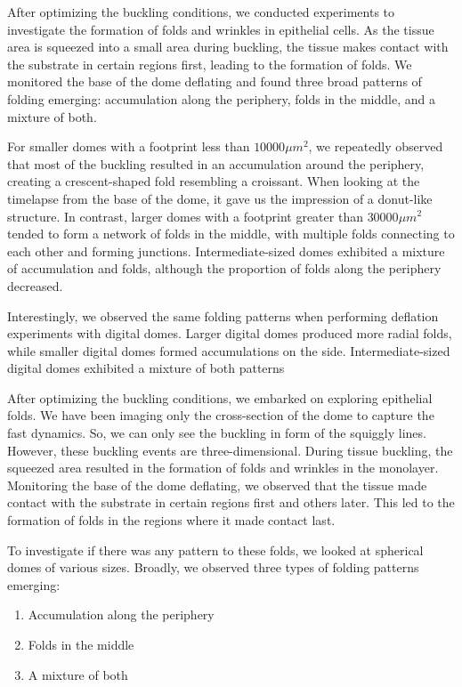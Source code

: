 After optimizing the buckling conditions, we conducted experiments to
investigate the formation of folds and wrinkles in epithelial cells. As
the tissue area is squeezed into a small area during buckling, the
tissue makes contact with the substrate in certain regions first,
leading to the formation of folds. We monitored the base of the dome
deflating and found three broad patterns of folding emerging:
accumulation along the periphery, folds in the middle, and a mixture of
both.

For smaller domes with a footprint less than \(10000 \mu m^2\), we
repeatedly observed that most of the buckling resulted in an
accumulation around the periphery, creating a crescent-shaped fold
resembling a croissant. When looking at the timelapse from the base of
the dome, it gave us the impression of a donut-like structure. In
contrast, larger domes with a footprint greater than \(30000\mu m^2\)
tended to form a network of folds in the middle, with multiple folds
connecting to each other and forming junctions. Intermediate-sized domes
exhibited a mixture of accumulation and folds, although the proportion
of folds along the periphery decreased.

Interestingly, we observed the same folding patterns when performing
deflation experiments with digital domes. Larger digital domes produced
more radial folds, while smaller digital domes formed accumulations on
the side. Intermediate-sized digital domes exhibited a mixture of both
patterns

After optimizing the buckling conditions, we embarked on exploring
epithelial folds. We have been imaging only the cross-section of the
dome to capture the fast dynamics. So, we can only see the buckling in
form of the squiggly lines. However, these buckling events are
three-dimensional. During tissue buckling, the squeezed area resulted in
the formation of folds and wrinkles in the monolayer. Monitoring the
base of the dome deflating, we observed that the tissue made contact
with the substrate in certain regions first and others later. This led
to the formation of folds in the regions where it made contact last.

To investigate if there was any pattern to these folds, we looked at
spherical domes of various sizes. Broadly, we observed three types of
folding patterns emerging:

\begin{enumerate}
	\def\labelenumi{\arabic{enumi}.}
	\item
	Accumulation along the periphery
	\item
	Folds in the middle
	\item
	A mixture of both
\end{enumerate}

